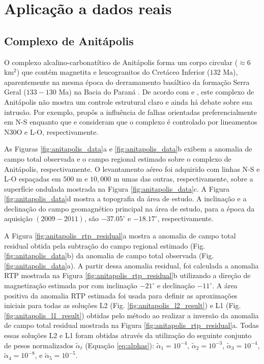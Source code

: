 \chapter{Aplicação a dados reais}


\section{Complexo de Anitápolis}
\label{subsec:anitapolis_complex}


O complexo alcalino-carbonatítico de Anitápolis forma um corpo circular 
($\approx 6$ km$^{2}$) que contém magnetita e leucogranitos do Cretáceo Inferior ($132$ Ma), aparentemente na mesma época do derramamento basáltico da formação Serra Geral ($133-130$ Ma) na Bacia do Paraná \citep{scheibe_etal2005, gomes_etal2018}. 
De acordo com \citet{riccomini_etal2005} e \citet{gomes_etal2018}, 
este complexo de Anitápolis não mostra um controle estrutural claro e ainda há debate sobre sua intrusão. 
Por exemplo, \citet{melcher_coutinho1966} propôs a influência de falhas orientadas preferencialmente em N-S
enquanto que \citet{horbach_marimon1980} e \citet{scheibe_etal2005} consideram que o complexo é controlado por lineamentos N30O e L-O, respectivamente.

As Figuras \ref{fig:anitapolis_data}a e \ref{fig:anitapolis_data}b exibem a anomalia de campo total observada e o campo regional estimado sobre o complexo de Anitápolis, respectivamente.
O levantamento aéreo foi adquirido com linhas N-S e L-O espaçadas em $500$ m e $10,000$ m umas das outras, respectivamente, sobre a superfície ondulada mostrada na Figura \ref{fig:anitapolis_data}c. 
A Figura \ref{fig:anitapolis_data}d mostra a topografia da área de estudo.
A inclinação e a declinação do campo geomagnético principal na área de estudo, para a época da aquisição $(2009-2011)$, são $-37.05^{\circ}$ e 
$-18.17^{\circ}$, respectivamente.

A Figura \ref{fig:anitapolis_rtp_residual}a mostra a anomalia de campo total residual obtida pela subtração do campo regional estimado (Fig. \ref{fig:anitapolis_data}b)
da anomalia de campo total observada (Fig. \ref{fig:anitapolis_data}a).
A partir dessa anomalia residual, foi calculada a anomalia RTP mostrada na Figura \ref{fig:anitapolis_rtp_residual}b utilizando a direção de magnetização estimada por \citet{reis_etal2019} com inclinação $-21^{\circ}$ e declinação $-11^{\circ}$.
A área positiva da anomalia RTP estimada foi usada para definir as aproximações iniciais para todas as soluções L2 (Fig. \ref{fig:anitapolis_l2_result}) e L1 
(Fig. \ref{fig:anitapolis_l1_result}) obtidas pelo método ao realizar a inversão da anomalia de campo total residual mostrada na Figura \ref{fig:anitapolis_rtp_residual}a.
Todas essas soluções L2 e L1 foram obtidas através da utilização do seguinte conjunto de pesos normalizados $\tilde{\alpha}_{\ell}$ (Equação \ref{eq:alphas}):
$\tilde{\alpha}_{1} = 10^{-4}$, $\tilde{\alpha}_{2} = 10^{-3}$, 
$\tilde{\alpha}_{3} = 10^{-4}$, $\tilde{\alpha}_{4} = 10^{-8}$, e 
$\tilde{\alpha}_{5} = 10^{-5}$.

